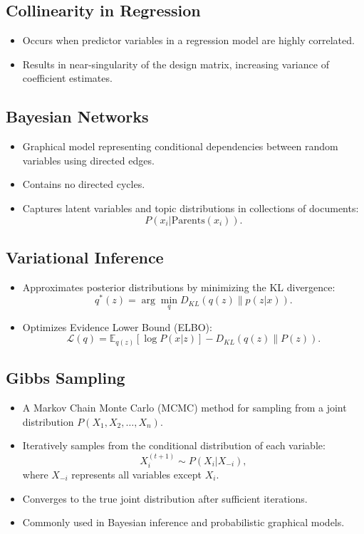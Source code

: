 \documentclass[12pt,a4paper]{article}
\begin{document}
\subsection{Collinearity in Regression}
\begin{itemize}
    \item Occurs when predictor variables in a regression model are highly correlated.
    \item Results in near-singularity of the design matrix, increasing variance of coefficient estimates.
\end{itemize}

\subsection{Bayesian Networks}
\begin{itemize}
    \item Graphical model representing conditional dependencies between random variables using directed edges.
    \item Contains no directed cycles.
    \item Captures latent variables and topic distributions in collections of documents:
    \[ P(x_i | \text{Parents}(x_i)). \]
\end{itemize}


\subsection{Variational Inference}
\begin{itemize}
    \item Approximates posterior distributions by minimizing the KL divergence:
    \[ q^*(z) = \arg\min_q D_{KL}(q(z) \| p(z|x)). \]
    \item Optimizes Evidence Lower Bound (ELBO):
    \[ \mathcal{L}(q) = \mathbb{E}_{q(z)}[\log P(x|z)] - D_{KL}(q(z) \| P(z)). \]
\end{itemize}

\subsection{Gibbs Sampling}
\begin{itemize}
    \item A Markov Chain Monte Carlo (MCMC) method for sampling from a joint distribution $P(X_1, X_2, \dots, X_n)$.
    \item Iteratively samples from the conditional distribution of each variable:
    \[ X_i^{(t+1)} \sim P(X_i | X_{-i}), \]
    where $X_{-i}$ represents all variables except $X_i$.
    \item Converges to the true joint distribution after sufficient iterations.
    \item Commonly used in Bayesian inference and probabilistic graphical models.
\end{itemize}
\end{document}
